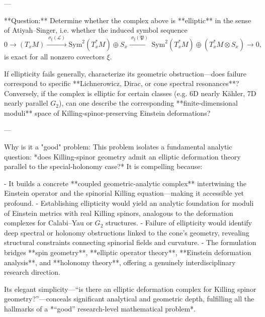 ---

**Question:**  
Determine whether the complex above is **elliptic** in the sense of Atiyah–Singer, i.e. whether the induced symbol sequence
\[
0 \longrightarrow (T_xM) \xrightarrow{\;\sigma_\xi(\mathcal{L})\;}
\mathrm{Sym}^2(T_x^*M)\oplus S_x
\xrightarrow{\;\sigma_\xi(\mathfrak{P})\;}
\mathrm{Sym}^2(T_x^*M)\oplus (T_x^*M\!\otimes\!S_x)
\longrightarrow 0,
\]
is exact for all nonzero covectors \(\xi\).  

If ellipticity fails generally, characterize its geometric obstruction—does failure correspond to specific **Lichnerowicz, Dirac, or cone spectral resonances**?  
Conversely, if the complex is elliptic for certain classes (e.g. 6D nearly Kähler, 7D nearly parallel \(G_2\)), can one describe the corresponding **finite-dimensional moduli** space of Killing-spinor-preserving Einstein deformations?

---

Why is it a "good" problem:  
This problem isolates a fundamental analytic question: *does Killing-spinor geometry admit an elliptic deformation theory parallel to the special-holonomy case?* It is compelling because:

- It builds a concrete **coupled geometric-analytic complex** intertwining the Einstein operator and the spinorial Killing equation—making it accessible yet profound.  
- Establishing ellipticity would yield an analytic foundation for moduli of Einstein metrics with real Killing spinors, analogous to the deformation complexes for Calabi–Yau or \(G_2\) structures.  
- Failure of ellipticity would identify deep spectral or holonomy obstructions linked to the cone’s geometry, revealing structural constraints connecting spinorial fields and curvature.  
- The formulation bridges **spin geometry**, **elliptic operator theory**, **Einstein deformation analysis**, and **holonomy theory**, offering a genuinely interdisciplinary research direction.  

Its elegant simplicity—“is there an elliptic deformation complex for Killing spinor geometry?”—conceals significant analytical and geometric depth, fulfilling all the hallmarks of a *“good” research-level mathematical problem*.